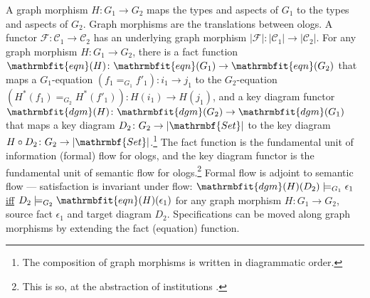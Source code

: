 \documentclass{amsart}
\theoremstyle{remark}
\theoremstyle{definition}
\begin{document}
A graph morphism $H \colon G_{1} \rightarrow G_{2}$ maps the types and aspects of $G_{1}$ to the types and aspects of $G_{2}$.
Graph morphisms are the translations between ologs.
A functor $\mathcal{F} \colon \mathcal{C}_{1} \rightarrow \mathcal{C}_{2}$ has 
an underlying graph morphism $|\mathcal{F}| \colon |\mathcal{C}_{1}| \rightarrow |\mathcal{C}_{2}|$.
For any graph morphism $H \colon G_{1} \rightarrow G_{2}$,
there is a fact function
$\mathrmbfit{eqn}(H) \colon \mathrmbfit{eqn}(G_{1}) \rightarrow \mathrmbfit{eqn}(G_{2})$ 
that maps a $G_{1}$-equation $(f_{1} =_{G_{1}} f'_{1}) \colon i_{1} \rightarrow j_{1}$
to the $G_{2}$-equation $(H^\ast(f_{1}) =_{G_{2}} H^\ast(f'_{1})) \colon H(i_{1}) \rightarrow H(j_{1})$,
and a key diagram functor
$\mathrmbfit{dgm}(H) \colon \mathrmbfit{dgm}(G_{2}) \rightarrow \mathrmbfit{dgm}(G_{1})$
that maps 
a key diagram $D_{2} \colon G_{2} \rightarrow |\mathrmbf{Set}|$
to the key diagram $H \circ D_{2} \colon G_{2} \rightarrow |\mathrmbf{Set}|$.\footnote{The composition of graph morphisms is written in diagrammatic order.}
The fact function is the fundamental unit of information (formal) flow for ologs, and
the key diagram functor is the fundamental unit of semantic flow for ologs.\footnote{This is so, at the abstraction of institutions \cite{K:SC}.}
Formal flow is adjoint to semantic flow
--- satisfaction is invariant under flow:
$\mathrmbfit{dgm}(H)(D_{2}) \models_{G_{1}} \epsilon_{1}$
\underline{iff}
$D_{2} \models_{G_{2}} \mathrmbfit{eqn}(H)(\epsilon_{1})$
for any graph morphism $H \colon G_{1} \rightarrow G_{2}$,
source fact $\epsilon_{1}$ and
target diagram $D_{2}$.
%
%
Specifications can be moved along graph morphisms by extending the fact (equation) function.
\end{document}
